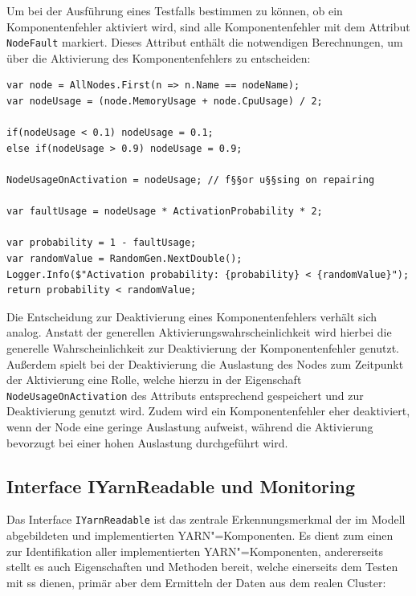 Um bei der Ausführung eines Testfalls bestimmen zu können, ob ein Komponentenfehler aktiviert wird, sind alle Komponentenfehler mit dem Attribut \texttt{NodeFault} markiert.
Dieses Attribut enthält die notwendigen Berechnungen, um über die Aktivierung des Komponentenfehlers zu entscheiden:

\begin{lstlisting}[label=lst:faultActivationCalc,style=cs,
caption={[Berechnung der Aktivierung von Komponentenfehlern]
    Berechnung der Aktivierung von Komponentenfehlern (zusammengefasst).}]
var node = AllNodes.First(n => n.Name == nodeName);
var nodeUsage = (node.MemoryUsage + node.CpuUsage) / 2;

if(nodeUsage < 0.1) nodeUsage = 0.1;
else if(nodeUsage > 0.9) nodeUsage = 0.9;

NodeUsageOnActivation = nodeUsage; // f§§or u§§sing on repairing

var faultUsage = nodeUsage * ActivationProbability * 2;

var probability = 1 - faultUsage;
var randomValue = RandomGen.NextDouble();
Logger.Info($"Activation probability: {probability} < {randomValue}");
return probability < randomValue;
\end{lstlisting}

Die Entscheidung zur Deaktivierung eines Komponentenfehlers verhält sich analog.
Anstatt der generellen Aktivierungswahrscheinlichkeit wird hierbei die generelle Wahrscheinlichkeit zur Deaktivierung der Komponentenfehler genutzt.
Außerdem spielt bei der Deaktivierung die Auslastung des Nodes zum Zeitpunkt der Aktivierung eine Rolle, welche hierzu in der Eigenschaft \texttt{NodeUsageOnActivation} des Attributs entsprechend gespeichert und zur Deaktivierung genutzt wird.
Zudem wird ein Komponentenfehler eher deaktiviert, wenn der Node eine geringe Auslastung aufweist, während die Aktivierung bevorzugt bei einer hohen Auslastung durchgeführt wird.

\subsection{Interface IYarnReadable und Monitoring}
\label{subsec:yarnComponentInterface}

Das Interface \texttt{IYarnReadable} ist das zentrale Erkennungsmerkmal der im Modell abgebildeten und implementierten YARN"=Komponenten.
Es dient zum einen zur Identifikation aller implementierten YARN"=Komponenten, andererseits stellt es auch Eigenschaften und Methoden bereit, welche einerseits dem Testen mit \gls{ss} dienen, primär aber dem Ermitteln der Daten aus dem realen Cluster:

